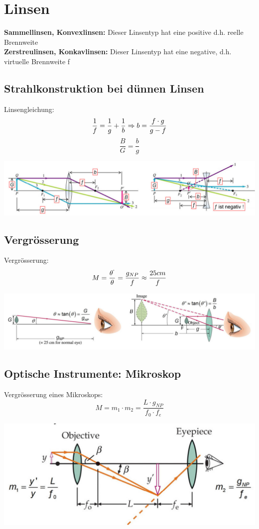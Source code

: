 \section{Linsen}
\textbf{Sammellinsen, Konvexlinsen:} 
Dieser Linsentyp hat eine positive d.h. reelle Brennweite
\\
\textbf{Zerstreulinsen, Konkavlinsen:} 
Dieser Linsentyp hat eine negative, d.h. virtuelle Brennweite f

\subsection{Strahlkonstruktion bei dünnen Linsen}
Linsengleichung:
\[
	\frac{1}{f} = \frac{1}{g} + \frac{1}{b} \\
	\Rightarrow \\
	b=\frac{f \cdot g}{g -f} \\ \\
\]
\[
	\frac{B}{G} =\frac{b}{g}
\]
\begin{center}
	\includegraphics[scale = 0.25]{images/strahlkonstruktion.jpg}
\end{center}

\subsection{Vergrösserung}
Vergrösserung:
\[
	M=\frac{\theta^`}{\theta}= \frac{g_{NP}}{f} \approx \frac{25cm}{f}
\]
\begin{center}
	\includegraphics[scale = 0.25]{images/vergroesserung.jpg}
\end{center}

\subsection{Optische Instrumente: Mikroskop}
Vergrösserung eines Mikroskops:
\[
	M=m_1 \cdot m_2 = \frac{L\cdot g_{NP}}{f_0 \cdot f_e}
\]
\begin{center}
	\includegraphics[scale = 0.2]{images/mikroskop.jpg}
\end{center}


